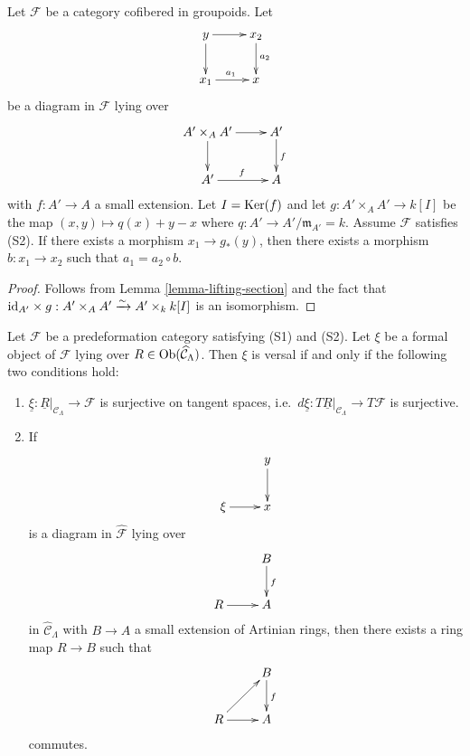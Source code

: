 \begin{lemma}
\label{lemma-lifting-along-small-extension}
Let $\mathcal F$ be a category cofibered in groupoids.  Let
\[
\xymatrix{
y \ar[r] \ar[d] & x_2 \ar[d]^{a_2} \\
x_1 \ar[r]^{a_1}        & x
}
\]
be a diagram in $\mathcal F$ lying over
\[
\xymatrix{
A' \times_{A} A' \ar[r] \ar[d] & A' \ar[d]^{f} \\
A' \ar[r]^{f} & A
}
\]
with $f: A' \rightarrow A$ a small extension. Let $I = \textnormal{Ker}(f)$ and 
let $g: A' \times_{A} A' \rightarrow k[I]$ be the map $(x,y) \mapsto q(x) + y - 
x$ where $q: A' \rightarrow A'/\mathfrak{m}_{A'} = k$.  Assume $\mathcal F$ 
satisfies \textnormal{(S2)}. If there exists a morphism $x_1 \rightarrow 
g_*(y)$, then there exists a morphism $b: x_1 \rightarrow x_2$ such that $a_1 = 
a_2 \circ b$.
\end{lemma}

\begin{proof}
Follows from Lemma \ref{lemma-lifting-section} and the fact that 
$\textnormal{id}_{A'} \times g: A' \times_{A} A' \xrightarrow{\sim} A' 
\times_{k} k[I]$ is an isomorphism.  
\end{proof}

\begin{lemma}
\label{lemma-versal-criterion}
Let $\mathcal F$ be a predeformation category satisfying \textnormal{(S1)} and 
\textnormal{(S2)}.  Let $\xi$ be a formal object of $\mathcal F$ lying over $R 
\in \textnormal{Ob}(\widehat{\mathcal C}_{\Lambda})$.  Then $\xi$ is versal if 
and only if the following two conditions hold:
\begin{enumerate}
\item $\underline{\xi}: \underline{R}|_{\mathcal C_{\Lambda}} \rightarrow 
\mathcal F$ is surjective on tangent spaces, i.e.\ $d\underline{\xi}: T 
\underline{R}|_{\mathcal C_{\Lambda}} \rightarrow T\mathcal F$ is surjective.
\item If 
\[
\xymatrix{
            &  y \ar[d] \\
\xi \ar[r]  &  x
}
\]
is a diagram in $\widehat{\mathcal F}$ lying over
\[
\xymatrix{
         &   B  \ar[d]^{f} \\
R \ar[r] &   A 
}
\]
in $\widehat{\mathcal C}_{\Lambda}$ with $B \rightarrow A$ a small extension of 
Artinian rings, then there exists a ring map $R \rightarrow B$ such that
\[
\xymatrix{
         &   B  \ar[d]^{f} \\
R \ar[ur] \ar[r] &   A 
}
\]
commutes.
\end{enumerate}
\end{lemma}

